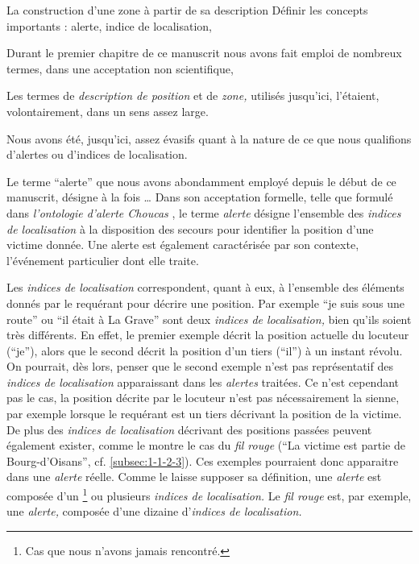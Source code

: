 
La construction d'une zone à partir de sa description 
%
Définir les concepts importants : alerte, indice de localisation,


Durant le premier chapitre de ce manuscrit nous avons fait emploi de
nombreux termes, dans une acceptation non scientifique, 

Les termes de \emph{description de position} et de \emph{zone,}
utilisés jusqu'ici, l'étaient, volontairement, dans un sens assez
large.


Nous avons été, jusqu'ici, assez évasifs quant à la nature de ce que
nous qualifions d'alertes ou d'indices de localisation.

Le terme \enquote{alerte} que nous avons abondamment employé depuis le
début de ce manuscrit, désigne à la fois …
%
Dans son acceptation formelle, telle que formulé dans
\emph{l’ontologie d'alerte Choucas} \autocite[\ac{oac},][]{Viry2019},
le terme \emph{alerte} désigne l'ensemble des \emph{indices de
  localisation} à la disposition des secours pour identifier la
position d'une victime donnée. Une alerte est également caractérisée
par son contexte, \ie l'événement particulier dont elle traite.

Les \emph{indices de localisation} correspondent, quant à eux, à
l'ensemble des éléments donnés par le requérant pour décrire une
position. Par exemple \enquote{je suis sous une route} ou \enquote{il
  était à La Grave} sont deux \emph{indices de localisation,} bien
qu'ils soient très différents. En effet, le premier exemple décrit la
position actuelle du locuteur (\enquote{je}), alors que le second
décrit la position d'un tiers (\enquote{il}) à un instant révolu. On
pourrait, dès lors, penser que le second exemple n'est pas
représentatif des \emph{indices de localisation} apparaissant dans les
\emph{alertes} traitées. Ce n'est cependant pas le cas, la position
décrite par le locuteur n'est pas nécessairement la sienne, par
exemple lorsque le requérant est un tiers décrivant la position de la
victime. De plus des \emph{indices de localisation} décrivant des
positions passées peuvent également exister, comme le montre le cas du
\emph{fil rouge} (\eg \enquote{La victime est partie de
  Bourg-d'Oisans}, cf. \autoref{subsec:1-1-2-3}). Ces exemples
pourraient donc apparaitre dans une \emph{alerte} réelle. Comme le
laisse supposer sa définition, une \emph{alerte} est composée d'un
\footnote{\label{note:cas_1_indice}Cas que nous n'avons jamais
  rencontré.} ou plusieurs \emph{indices de localisation.} Le
\emph{fil rouge} est, par exemple, une \emph{alerte,} composée d'une
dizaine d'\emph{indices de localisation.}

